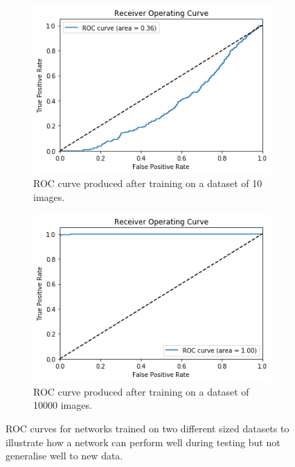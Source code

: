 \documentclass[12pt, onecolumn]{aa}
\begin{document}
\begin{figure}[h]
\centering
    \begin{subfigure}{0.45\textwidth}
    \includegraphics[width=\linewidth]{Figures/ROC2.png}
    \caption{ROC curve produced after training on a dataset of 10 images.}
    \label{fig:roc_1}
    \end{subfigure}
    \begin{subfigure}{0.45\textwidth}
    \includegraphics[width=\linewidth]{Figures/ROC2_2.png}
    \caption{ROC curve produced after training on a dataset of 10000 images.}
    \label{fig:roc_2}
    \end{subfigure}
    \caption{ROC curves for networks trained on two different sized datasets to illustrate how a network can perform well during testing but not generalise well to new data.}
    \label{fig:fmnistroc}
\end{figure}
\end{document}
